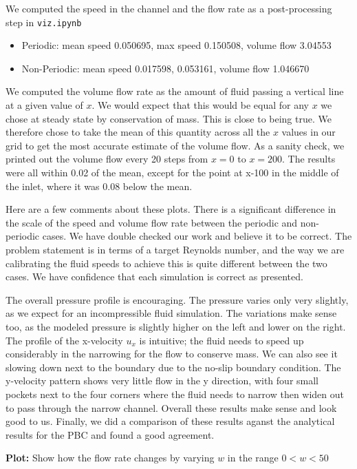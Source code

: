 \documentclass[11pt]{article}
\newcommand{\tty}[1]{\texttt{#1}}
\begin{document}
We computed the speed in the channel and the flow rate as a post-processing step in \tty{viz.ipynb}
\begin{itemize}
\item Periodic: mean speed 0.050695, max speed 0.150508, volume flow 3.04553
\item Non-Periodic: mean speed 0.017598, 0.053161, volume flow 1.046670
\end{itemize}

We computed the volume flow rate as the amount of fluid passing a vertical line
at a given value of $x$.  We would expect that this would be equal for any $x$ 
we chose at steady state by conservation of mass.  This is close to being true.
We therefore chose to take the mean of this quantity across all the $x$ values
in our grid to get the most accurate estimate of the volume flow.
As a sanity check, we printed out the volume flow every 20 steps from $x=0$ to 
$x=200$.  The results were all within 0.02 of the mean, except for the point
at x-100 in the middle of the inlet, where it was 0.08 below the mean.

Here are a few comments about these plots.
There is a significant difference in the scale of the speed and volume flow rate between
the periodic and non-periodic cases.
We have double checked our work and believe it to be correct.
The problem statement is in terms of a target Reynolds number, 
and the way we are calibrating the fluid speeds to achieve this is
quite different between the two cases.
We have confidence that each simulation is correct as presented.

The overall pressure profile is encouraging.  
The pressure varies only very slightly, as we expect for an incompressible fluid simulation.
The variations make sense too, as the modeled pressure is slightly higher on
the left and lower on the right.
The profile of the x-velocity $u_x$ is intuitive; the fluid needs to speed up
considerably in the narrowing for the flow to conserve mass.
We can also see it slowing down next to the boundary due to the 
no-slip boundary condition.
The y-velocity pattern shows very little flow in the y direction,
with four small pockets next to the four corners where the fluid
needs to narrow then widen out to pass through the narrow channel.
Overall these results make sense and look good to us.
Finally, we did a comparison of these results aganst the analytical
results for the PBC and found a good agreement.

    \textbf{Plot:}
    Show how the flow rate changes by varying $w$ in the range $0<w<50$
\end{document}
